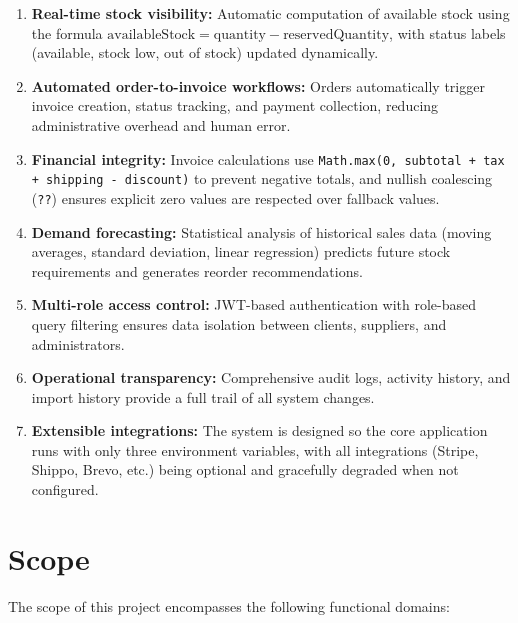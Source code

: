 ﻿\documentclass[12pt,a4paper]{report}
\begin{document}
\begin{enumerate}[leftmargin=1.5em]
  \item \textbf{Real-time stock visibility:} Automatic computation of available stock using the formula $\text{availableStock} = \text{quantity} - \text{reservedQuantity}$, with status labels (available, stock low, out of stock) updated dynamically.
  \item \textbf{Automated order-to-invoice workflows:} Orders automatically trigger invoice creation, status tracking, and payment collection, reducing administrative overhead and human error.
  \item \textbf{Financial integrity:} Invoice calculations use \texttt{Math.max(0, subtotal + tax + shipping - discount)} to prevent negative totals, and nullish coalescing (\texttt{??}) ensures explicit zero values are respected over fallback values.
  \item \textbf{Demand forecasting:} Statistical analysis of historical sales data (moving averages, standard deviation, linear regression) predicts future stock requirements and generates reorder recommendations.
  \item \textbf{Multi-role access control:} JWT-based authentication with role-based query filtering ensures data isolation between clients, suppliers, and administrators.
  \item \textbf{Operational transparency:} Comprehensive audit logs, activity history, and import history provide a full trail of all system changes.
  \item \textbf{Extensible integrations:} The system is designed so the core application runs with only three environment variables, with all integrations (Stripe, Shippo, Brevo, etc.) being optional and gracefully degraded when not configured.
\end{enumerate}

\section{Scope}

The scope of this project encompasses the following functional domains:
\end{document}
